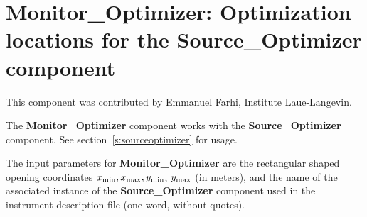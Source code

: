
\section{Monitor\_Optimizer: Optimization locations for the
  Sour\-ce\_Op\-ti\-miz\-er component}
\label{s:monitoroptimizer}

This component was contributed by Emmanuel Farhi, Institute
Laue-Langevin.

The {\bf Monitor\_Optimizer} component works with the {\bf
  Source\_Optimizer} component. See section~\ref{s:sourceoptimizer}
for usage.

The input parameters for {\bf Monitor\_Optimizer} are the rectangular
shaped opening coordinates $x_{\rm min}, x_{\rm max}, y_{\rm min}$,
$y_{\rm max}$ (in meters), and the name of the associated instance of
the {\bf
  Source\_Optimizer} component used in the instrument description file (one word,
without quotes).
